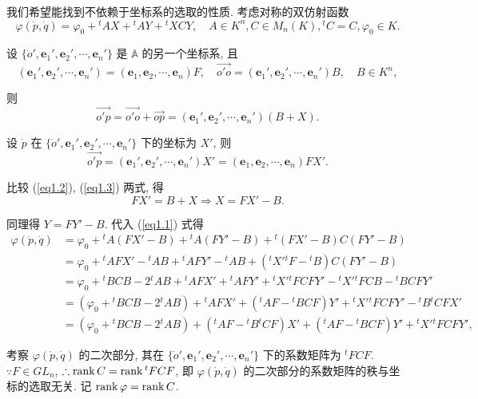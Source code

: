 \documentclass[color=black,device=normal,lang=cn,mode=geye]{elegantnote}
\begin{document}
我们希望能找到不依赖于坐标系的选取的性质. 考虑对称的双仿射函数
\begin{equation}\label{eq1.1}
    \varphi(\dot{p},\dot{q})=\varphi_0+{}^tAX+{}^tAY+{}^tXCY,\quad A\in K^n,C\in M_n(K),{}^tC=C,\varphi_0\in K.
\end{equation}

设 $\{\dot{o}',\boldsymbol{e}_1',\boldsymbol{e}_2',\cdots,\boldsymbol{e}_n'\}$ 是 $\mathbb{A}$ 的另一个坐标系, 且
\[(\boldsymbol{e}_1',\boldsymbol{e}_2',\cdots,\boldsymbol{e}_n')=(\boldsymbol{e}_1,\boldsymbol{e}_2,\cdots,\boldsymbol{e}_n)F,\quad\overrightarrow{o'o}=(\boldsymbol{e}_1',\boldsymbol{e}_2',\cdots,\boldsymbol{e}_n')B,\quad B\in K^n,\]

则
\begin{equation}\label{eq1.2}
    \overrightarrow{o'p}=\overrightarrow{o'o}+\overrightarrow{op}=(\boldsymbol{e}_1',\boldsymbol{e}_2',\cdots,\boldsymbol{e}_n')(B+X).
\end{equation}

设 $\dot{p}$ 在 $\{\dot{o}',\boldsymbol{e}_1',\boldsymbol{e}_2',\cdots,\boldsymbol{e}_n'\}$ 下的坐标为 $X'$, 则
\begin{equation}\label{eq1.3}
    \overrightarrow{o'p}=(\boldsymbol{e}_1',\boldsymbol{e}_2',\cdots,\boldsymbol{e}_n')X'=(\boldsymbol{e}_1,\boldsymbol{e}_2,\cdots,\boldsymbol{e}_n)FX'.
\end{equation}

比较 (\ref{eq1.2}), (\ref{eq1.3}) 两式, 得
\[FX'=B+X\Rightarrow X=FX'-B.\]

同理得 $Y=FY'-B$. 代入 (\ref{eq1.1}) 式得
\begin{align*}
    \varphi(\dot{p},\dot{q}) & =\varphi_0+{}^tA(FX'-B)+{}^tA(FY'-B)+{}^t(FX'-B)C(FY'-B) \\
    & =\varphi_0+{}^tAFX'-{}^tAB+{}^tAFY'-{}^tAB+({}^tX'{}^tF-{}^tB)C(FY'-B) \\
    & =\varphi_0+{}^tBCB-2{}^tAB+{}^tAFX'+{}^tAFY'+{}^tX'{}^tFCFY'-{}^tX'{}^tFCB-{}^tBCFY' \\
    & =(\varphi_0+{}^tBCB-2{}^tAB)+{}^tAFX'+({}^tAF-{}^tBCF)Y'+{}^tX'{}^tFCFY'-{}^tB{}^tCFX' \\
    & =(\varphi_0+{}^tBCB-2{}^tAB)+({}^tAF-{}^tB{}^tCF)X'+({}^tAF-{}^tBCF)Y'+{}^tX'{}^tFCFY',
\end{align*}

考察 $\varphi(\dot{p},\dot{q})$ 的二次部分, 其在 $\{\dot{o}',\boldsymbol{e}_1',\boldsymbol{e}_2',\cdots,\boldsymbol{e}_n'\}$ 下的系数矩阵为 ${}^tFCF$. $\because F\in GL _n$, $\therefore\operatorname{rank} C=\operatorname{rank} {}^tFCF$, 即 $\varphi(\dot{p},\dot{q})$ 的二次部分的系数矩阵的秩与坐标的选取无关. 记 $\operatorname{rank} \varphi=\operatorname{rank} C$.
\end{document}
